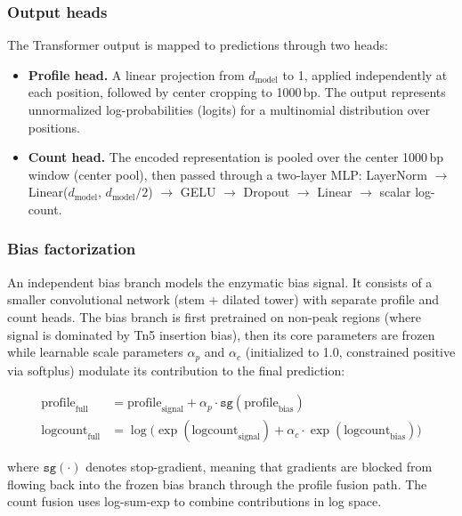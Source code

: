 \documentclass[11pt,a4paper]{article}
\begin{document}
\subsubsection{Output heads}

The Transformer output is mapped to predictions through two heads:

\begin{itemize}[leftmargin=2em]
  \item \textbf{Profile head.} A linear projection from $d_{\text{model}}$
  to 1, applied independently at each position, followed by center
  cropping to 1000\,bp. The output represents unnormalized log-probabilities
  (logits) for a multinomial distribution over positions.

  \item \textbf{Count head.} The encoded representation is pooled over
  the center 1000\,bp window (center pool), then passed through a
  two-layer MLP: LayerNorm $\to$ Linear($d_{\text{model}}$,
  $d_{\text{model}}/2$) $\to$ GELU $\to$ Dropout $\to$ Linear $\to$
  scalar log-count.
\end{itemize}

\subsubsection{Bias factorization}

An independent bias branch models the enzymatic bias signal. It
consists of a smaller convolutional network (stem + dilated tower)
with separate profile and count heads. The bias branch is first
pretrained on non-peak regions (where signal is dominated by Tn5
insertion bias), then its core parameters are frozen while learnable
scale parameters $\alpha_p$ and $\alpha_c$ (initialized to 1.0,
constrained positive via softplus) modulate its contribution to the
final prediction:

\begin{align}
  \text{profile}_{\text{full}} &= \text{profile}_{\text{signal}}
    + \alpha_p \cdot \texttt{sg}(\text{profile}_{\text{bias}})
    \label{eq:fusion-profile} \\
  \text{logcount}_{\text{full}} &= \log\bigl(
    \exp(\text{logcount}_{\text{signal}})
    + \alpha_c \cdot \exp(\text{logcount}_{\text{bias}})
  \bigr)
    \label{eq:fusion-count}
\end{align}

\noindent where $\texttt{sg}(\cdot)$ denotes stop-gradient, meaning
that gradients are blocked from flowing back into the frozen bias
branch through the profile fusion path. The count fusion uses
log-sum-exp to combine contributions in log space.
\end{document}

